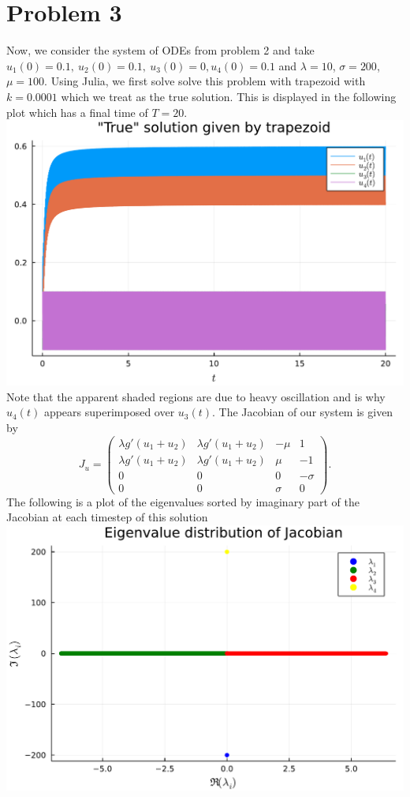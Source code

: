 \documentclass{article}
\begin{document}
\section{Problem 3}
Now, we consider the system of ODEs from problem 2 and take $u_1(0) = 0.1, ~u_2(0) = 0.1, ~u_3(0) = 0, u_4(0) = 0.1$ and $\lambda = 10$, $\sigma = 200$, $\mu = 100$. Using Julia, we first solve solve this problem with trapezoid with $k = 0.0001$ which we treat as the true solution. This is displayed in the following plot which has a final time of $T=20$. \\
\includegraphics[scale=0.5]{trap.pdf}\\
Note that the apparent shaded regions are due to heavy oscillation and is why $u_4(t)$ appears superimposed over $u_3(t)$. The Jacobian of our system is given by
\[
J_u=\begin{pmatrix}
\lambda g'(u_1+u_2) &\lambda g'(u_1+u_2) &-\mu &1\\
\lambda g'(u_1+u_2) &\lambda g'(u_1+u_2) &\mu &-1\\
0 &0 &0 &-\sigma\\
0 &0 &\sigma &0
\end{pmatrix}.
\]
The following is a plot of the eigenvalues sorted by imaginary part of the Jacobian at each timestep of this solution\\
\includegraphics[scale=0.5]{eigvals.pdf}\\
\end{document}
